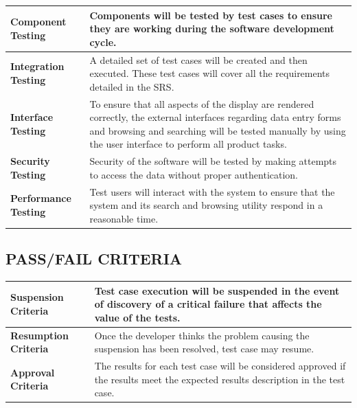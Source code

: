 \documentclass[twoside,letterpaper]{article}
\begin{document}
\begin{center}
\begin{tabular}{ | M{4cm} | M{12cm}| } 
\hline
\textbf{Component Testing} & Components will be tested by test cases to ensure they are working during the software development cycle.\\ 
\hline
\textbf{Integration Testing} & A detailed set of test cases will be created and then executed.  These test cases will cover all the requirements detailed in the SRS.\\ 
\hline
\textbf{Interface Testing} & To ensure that all aspects of the display are rendered correctly, the external interfaces regarding data entry forms and browsing and searching will be tested manually by using the user interface to perform all product tasks.\\ 
\hline
\textbf{Security Testing} & Security of the software will be tested by making attempts to access the data without proper authentication.\\ 
\hline
\textbf{Performance Testing} & Test users will interact with the system to ensure that the system and its search and browsing utility respond in a reasonable time.\\ 
\hline
\end{tabular}
\end{center}

\subsection{PASS/FAIL CRITERIA}
\begin{center}
\begin{tabular}{ | M{4cm} | M{12cm}| } 
\hline
\textbf{Suspension Criteria} & Test case execution will be suspended in the event of discovery of a critical failure that affects the value of the tests.\\ 
\hline
\textbf{Resumption Criteria} & Once the developer thinks the problem causing the suspension has been resolved, test case may resume.\\ 
\hline
\textbf{Approval Criteria} & The results for each test case will be considered approved if the results meet the expected results description in the test case.\\ 
\hline
\end{tabular}
\end{center}
\end{document}

